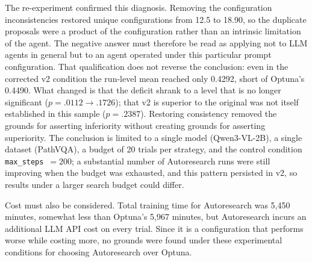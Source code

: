 The re-experiment confirmed this diagnosis. Removing the configuration
inconsistencies restored unique configurations from 12.5 to 18.90, so the
duplicate proposals were a product of the configuration rather than an intrinsic
limitation of the agent. The negative answer must therefore be read as applying
not to LLM agents in general but to an agent operated under this particular prompt
configuration. That qualification does not reverse the conclusion: even in the
corrected v2 condition the run-level mean reached only 0.4292, short of Optuna's
0.4490. What changed is that the deficit shrank to a level that is no longer
significant ($p = .0112 \rightarrow .1726$); that v2 is superior to the original
was not itself established in this sample ($p = .2387$). Restoring consistency
removed the grounds for asserting inferiority without creating grounds for
asserting superiority. The conclusion is limited to a single model
(Qwen3-VL-2B), a single dataset (PathVQA), a budget of 20 trials per strategy,
and the control condition \texttt{max\_steps}~$=200$; a substantial number of
Autoresearch runs were still improving when the budget was exhausted, and this
pattern persisted in v2, so results under a larger search budget could differ.

Cost must also be considered. Total training time for Autoresearch was 5,450
minutes, somewhat less than Optuna's 5,967 minutes, but Autoresearch incurs an
additional LLM API cost on every trial. Since it is a configuration that performs
worse while costing more, no grounds were found under these experimental
conditions for choosing Autoresearch over Optuna.
